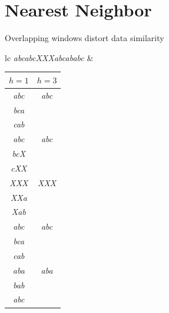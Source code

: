 \documentclass{beamer}
\begin{document}
  \section{Nearest Neighbor}


  \begin{frame}{Overlapping windows distort data similarity}

    \begin{tabular}{lc}
      \emph{abcabcXXXabcababc} &
      \begin{small} 
          \begin{tabular}{|c||c|}
            \hline
            $h=1$ & $h=3$ \\
            \hline
            \hline
            \emph{abc} & \emph{abc} \\
            \emph{bca} & \\
            \emph{cab} & \\
            \hline
            \emph{abc} & \emph{abc} \\
            \emph{bcX} & \\
            \emph{cXX} & \\
            \hline
            \emph{XXX} & \emph{XXX} \\
            \emph{XXa} & \\
            \emph{Xab} & \\
            \hline
            \emph{abc} & \emph{abc} \\
            \emph{bca} & \\
            \emph{cab} & \\
            \hline
            \emph{aba} & \emph{aba} \\ 
            \emph{bab} & \\
            \emph{abc} & \\
            \hline
          \end{tabular}
      \end{small}
    \end{tabular}

  \end{frame}
\end{document}
